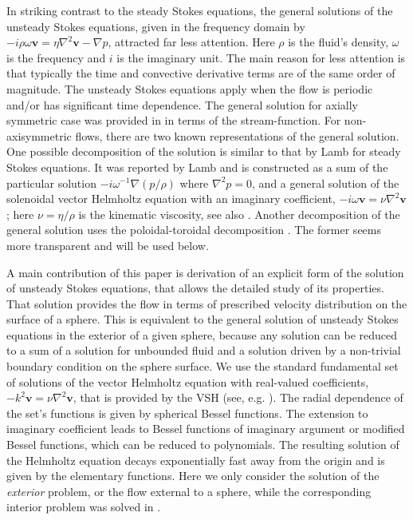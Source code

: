 \documentclass[aps,prx,twocolumn,amsmath,amssymb,amsfonts]{revtex4-2}
\begin{document}
In striking contrast to the steady Stokes equations, the general solutions of the unsteady Stokes equations, given in the frequency domain by $-i\rho \omega \bm v=\eta\nabla^2\bm v-\nabla p$, attracted far less attention. Here $\rho$ is the fluid's density, $\omega$ is the frequency and $i$ is the imaginary unit. The main reason for less attention is that typically the time and convective derivative terms are of the same order of magnitude. The unsteady Stokes equations apply when the flow is periodic and/or has significant time dependence.  The general solution for axially symmetric case was provided in \cite{rao} in terms of the stream-function. For non-axisymmetric flows, there are two known representations of the general solution. One possible decomposition of the solution is similar to that by Lamb for steady Stokes equations. It was reported by Lamb \cite{Lamb} and is constructed as a sum of the particular solution $-i \omega^{-1}\nabla (p/\rho)$ where $\nabla^2 p=0$, and a general solution of the solenoidal vector Helmholtz equation with an imaginary coefficient, $-i\omega \bm v=\nu\nabla^2\bm v$; here $\nu=\eta/\rho$ is the kinematic viscosity, see also \cite{Yang}. Another decomposition of the general solution uses the poloidal-toroidal decomposition \cite{pad}. The former seems more transparent and will be used below.

A main contribution of this paper is derivation of an explicit form of the solution of unsteady Stokes equations, that allows the detailed study of its properties. That solution provides the flow in terms of prescribed velocity distribution on the surface of a sphere. This is equivalent to the general solution of unsteady Stokes equations in the exterior of a given sphere, because any solution can be reduced to a sum of a solution for unbounded fluid and a solution driven by a non-trivial boundary condition on the sphere surface. We use the standard fundamental set of solutions of the vector Helmholtz equation with real-valued coefficients, $-k^2\bm v=\nu\nabla^2\bm v$, that is provided by the VSH (see, e.g. \cite{abs,St}). The radial dependence of the set's functions is given by spherical Bessel functions. The extension to imaginary coefficient leads to Bessel functions of imaginary argument or modified Bessel functions, which can be reduced to polynomials. The resulting solution of the Helmholtz equation decays exponentially fast away from the origin and is given by the elementary functions. Here we only consider the solution of the \emph{exterior} problem, or the flow external to a sphere, while the corresponding interior problem was solved in \cite{inter}.
\end{document}
